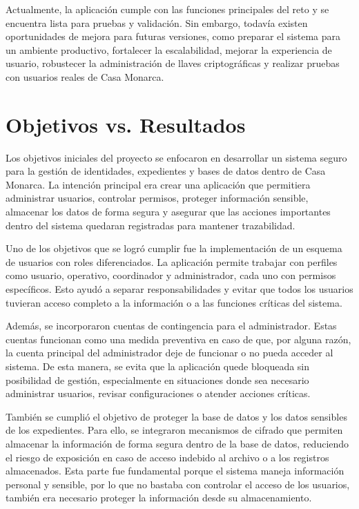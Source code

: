 \documentclass[10pt, letterpaper]{article}
\begin{document}
Actualmente, la aplicación cumple con las funciones principales del reto y se encuentra lista para pruebas y validación. Sin embargo, todavía existen oportunidades de mejora para futuras versiones, como preparar el sistema para un ambiente productivo, fortalecer la escalabilidad, mejorar la experiencia de usuario, robustecer la administración de llaves criptográficas y realizar pruebas con usuarios reales de Casa Monarca.


\section{Objetivos vs. Resultados}
Los objetivos iniciales del proyecto se enfocaron en desarrollar un sistema seguro para la gestión de identidades, expedientes y bases de datos dentro de Casa Monarca. La intención principal era crear una aplicación que permitiera administrar usuarios, controlar permisos, proteger información sensible, almacenar los datos de forma segura y asegurar que las acciones importantes dentro del sistema quedaran registradas para mantener trazabilidad.

Uno de los objetivos que se logró cumplir fue la implementación de un esquema de usuarios con roles diferenciados. La aplicación permite trabajar con perfiles como usuario, operativo, coordinador y administrador, cada uno con permisos específicos. Esto ayudó a separar responsabilidades y evitar que todos los usuarios tuvieran acceso completo a la información o a las funciones críticas del sistema.

Además, se incorporaron cuentas de contingencia para el administrador. Estas cuentas funcionan como una medida preventiva en caso de que, por alguna razón, la cuenta principal del administrador deje de funcionar o no pueda acceder al sistema. De esta manera, se evita que la aplicación quede bloqueada sin posibilidad de gestión, especialmente en situaciones donde sea necesario administrar usuarios, revisar configuraciones o atender acciones críticas.

También se cumplió el objetivo de proteger la base de datos y los datos sensibles de los expedientes. Para ello, se integraron mecanismos de cifrado que permiten almacenar la información de forma segura dentro de la base de datos, reduciendo el riesgo de exposición en caso de acceso indebido al archivo o a los registros almacenados. Esta parte fue fundamental porque el sistema maneja información personal y sensible, por lo que no bastaba con controlar el acceso de los usuarios, también era necesario proteger la información desde su almacenamiento.
\end{document}
